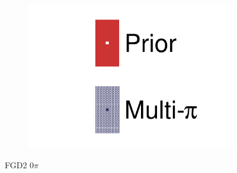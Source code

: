 \begin{figure}[h]
\begin{subfigure}[t]{0.32\textwidth}
		\includegraphics[width=\textwidth,page=38, trim={0mm 0mm 0mm 0mm}, clip]{figures/mach3/2018/data/2018a_FixedCov_RedCov_Mpi_Data_merge_drawPar_withDet}
	\end{subfigure}
	\caption{FGD2 0$\pi$}
	\label{fig:data_multipi_det_fdg2_cc0pi}
\end{figure}

